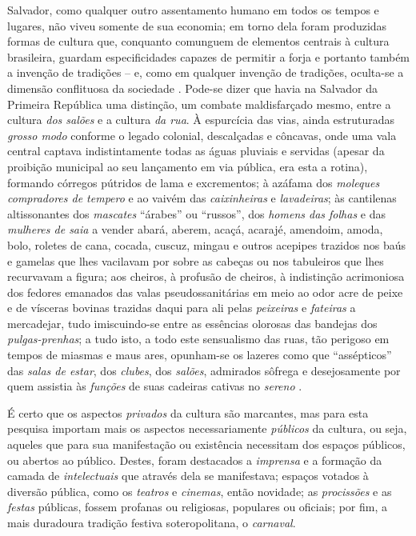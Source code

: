 Salvador, como qualquer outro assentamento humano em todos os tempos e lugares, não viveu somente de sua economia; em torno dela foram produzidas formas de cultura que, conquanto comunguem de elementos centrais à cultura brasileira, guardam especificidades capazes de permitir a forja e portanto também a invenção de tradições -- e, como em qualquer invenção de tradições, oculta-se a dimensão conflituosa da sociedade \cite{mariano_baianidade_2009,pinho_baianidade_1998}. Pode-se dizer que havia na Salvador da Primeira República uma distinção, um combate maldisfarçado mesmo, entre a cultura \textit{dos salões} e a cultura \textit{da rua}. À espurcícia das vias, ainda estruturadas \textit{grosso modo} conforme o legado colonial, descalçadas e côncavas, onde uma vala central captava indistintamente todas as águas pluviais e servidas (apesar da proibição municipal ao seu lançamento em via pública, era esta a rotina), formando córregos pútridos de lama e excrementos; à azáfama dos \textit{moleques compradores de tempero} e ao vaivém das \textit{caixinheiras} e \textit{lavadeiras}; às cantilenas altissonantes dos \textit{mascates} ``árabes'' ou ``russos'', dos \textit{homens das folhas} e das \textit{mulheres de saia} a vender abará, aberem, acaçá, acarajé, amendoim, amoda, bolo, roletes de cana, cocada, cuscuz, mingau e outros acepipes trazidos nos baús e gamelas que lhes vacilavam por sobre as cabeças ou nos tabuleiros que lhes recurvavam a figura; aos cheiros, à profusão de cheiros, à indistinção acrimoniosa dos fedores emanados das valas pseudossanitárias em meio ao odor acre de peixe e de vísceras bovinas trazidas daqui para ali pelas \textit{peixeiras} e \textit{fateiras} a mercadejar, tudo imiscuindo-se entre as essências  olorosas das bandejas dos \textit{pulgas-prenhas}; a tudo isto, a todo este sensualismo das ruas, tão perigoso em tempos de miasmas e maus ares, opunham-se os lazeres como que ``assépticos'' das \textit{salas de estar}, dos \textit{clubes}, dos \textit{salões}, admirados sôfrega e desejosamente por quem assistia às \textit{funções} de suas cadeiras cativas no \textit{sereno} \cite{vianna_bahia_1973}.

É certo que os aspectos \textit{privados} da cultura são marcantes, mas para esta pesquisa importam mais os aspectos necessariamente \textit{públicos} da cultura, ou seja, aqueles que para sua manifestação ou existência necessitam dos espaços públicos, ou abertos ao público. Destes, foram destacados a \textit{imprensa} e a formação da camada de \textit{intelectuais} que através dela se manifestava; espaços votados à diversão pública, como os \textit{teatros} e \textit{cinemas}, então novidade; as \textit{procissões} e as \textit{festas} públicas, fossem profanas ou religiosas, populares ou oficiais; por fim, a mais duradoura tradição festiva soteropolitana, o \textit{carnaval}.

